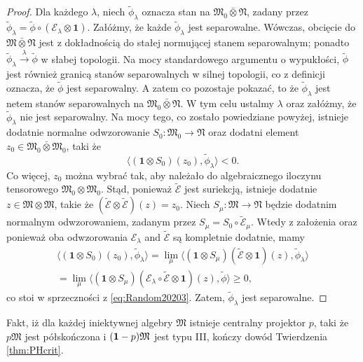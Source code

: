 \begin{proof}
Dla każdego $\lambda$, niech $\tilde{\phi}_{\lambda}$ oznacza stan na
$\mathfrak{M}_{0} \bar{\otimes} \mathfrak{N}$, zadany przez
$\tilde{\phi}_{\lambda} = \tilde{\phi} \circ(\mathcal{E}_{\lambda}
\otimes \mathbf{1})$.
Załóżmy, że każde $\tilde{\phi}_{\lambda}$ jest separowalne.
Wówczas, obcięcie do $\mathfrak{M} \bar{\otimes} \mathfrak{N}$ jest
z dokładnością do stałej normującej stanem separowalnym; ponadto
$\tilde{\phi}_{\lambda} \stackrel{\lambda}{\rightarrow}
\tilde{\phi}$ w słabej topologii.
Na mocy standardowego argumentu o wypukłości,
$\tilde{\phi}$ jest również granicą stanów separowalnych w silnej topologii,
co z definicji oznacza, że $\tilde{\phi}$ jest separowalny.
A zatem co pozostaje pokazać, to że  $\tilde{\phi}_{\lambda}$
jest netem stanów separowalnych na $\mathfrak{M}_{0} \bar{\otimes} \mathfrak{N}$.
W tym celu ustalmy $\lambda$ oraz załóżmy, że $\tilde{\phi}_{\lambda}$
nie jest separowalny.
Na mocy tego, co zostało powiedziane powyżej,
istnieje dodatnie normalne odwzorowanie
$S_{0}: \mathfrak{M}_{0} \rightarrow \mathfrak{N}$
oraz dodatni element
$z_{0} \in \mathfrak{M}_{0} \bar{\otimes} \mathfrak{M}_{0}$,
taki że
\begin{equation}
\label{eq:Random20203}
\langle(\mathbf{1} \otimes S_{0})(z_{0}),\tilde{\phi}_{\lambda}\rangle < 0.
\end{equation}
Co więcej, $z_{0}$ można wybrać tak, aby należało do algebraicznego
iloczynu tensorowego $\mathfrak{M}_{0} \otimes \mathfrak{M}_{0}$.
Stąd, ponieważ $\tilde{\mathcal{E}}$ jest suriekcją,
istnieje dodatnie
$z \in \mathfrak{M} \otimes \mathfrak{M}$, takie że
$(\tilde{\mathcal{E}} \otimes \tilde{\mathcal{E}})(z) = z_{0}$.
Niech $S_{\mu}: \mathfrak{M} \rightarrow \mathfrak{N}$
będzie dodatnim normalnym odwzorowaniem, zadanym przez
$S_{\mu} = S_{0} \circ \tilde{\mathcal{E}}_{\mu}$.
Wtedy z założenia oraz ponieważ oba odwzorowania
$\mathcal{E}_{\lambda}$ and $\tilde{\mathcal{E}}$
są kompletnie dodatnie, mamy
\begin{eqnarray}
\langle(\mathbf{1} \otimes S_{0})(z_{0}),\tilde{\phi}_{\lambda} \rangle =
\lim \limits_{\mu} \langle(\mathbf{1} \otimes S_{\mu})(\tilde{\mathcal{E}}
\otimes \mathbf{1})(z) ,\tilde{\phi}_{\lambda}\rangle \nonumber \\
= \lim \limits_{\mu} \langle
(\mathbf{1} \otimes S_{\mu})(\mathcal{E}_{\lambda}\circ
\tilde{\mathcal{E}}\otimes \mathbf{1})(z) ,\tilde{\phi}\rangle \geq 0,
\end{eqnarray}
co stoi w sprzeczności z \eqref{eq:Random20203}.
Zatem, $\tilde{\phi}_{\lambda}$
jest separowalne.
\end{proof}

Fakt, iż dla każdej iniektywnej algebry $\mathfrak{M}$
istnieje centralny projektor $p$, taki że $p\mathfrak{M}$
jest półskończona i $({\bf 1}-p)\mathfrak{M}$ jest typu III,
kończy dowód Twierdzenia \ref{thm:PHcrit}.





